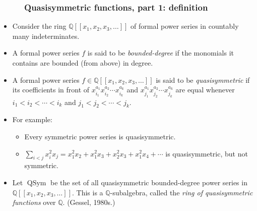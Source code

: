 \documentclass{beamer}
\newcommand{\QQ}{{\mathbb Q}}
\newcommand{\QSym}{\operatorname{QSym}}
\newcommand{\fti}[1]{\frametitle{\ \ \ \ \ #1}}
\newcommand{\defn}[1]{{\color{darkred}\emph{#1}}} %
\theoremstyle{plain}
\begin{document}
\begin{frame}
\fti{Quasisymmetric functions, part 1: definition}

\begin{itemize}

\item Consider the ring $\QQ\left[\left[x_1,x_2,x_3,\ldots\right]\right]$
      of formal power series in countably many indeterminates.

\pause

\item A formal power series $f$ is said to be \defn{bounded-degree} if
      the monomials it contains are bounded (from above) in degree.

\pause

\item A formal power series $f \in \QQ\left[\left[x_1,x_2,x_3,\ldots\right]\right]$ is said to be \defn{quasisymmetric} if its coefficients in front of $x_{i_1}^{a_1} x_{i_2}^{a_2} \cdots x_{i_k}^{a_k}$ and $x_{j_1}^{a_1} x_{j_2}^{a_2} \cdots x_{j_k}^{a_k}$ are equal whenever $i_1 < i_2 < \cdots < i_k$ and $j_1 < j_2 < \cdots < j_k$.

\item For example:
\begin{itemize}
\item Every symmetric power series is quasisymmetric.

\item $\sum\limits_{i<j} x_i^2 x_j = x_1^2 x_2 + x_1^2 x_3 + x_2^2 x_3 + x_1^2 x_4 + \cdots$ is quasisymmetric, but not symmetric.

\end{itemize}

\pause

\item Let \defn{$\QSym$} be the set of all quasisymmetric bounded-degree power series in $\QQ\left[\left[x_1,x_2,x_3,\ldots\right]\right]$. This is a $\QQ$-subalgebra, called the \defn{ring of quasisymmetric functions} over $\QQ$. (Gessel, 1980s.)

\end{itemize}

\end{frame}
\end{document}
